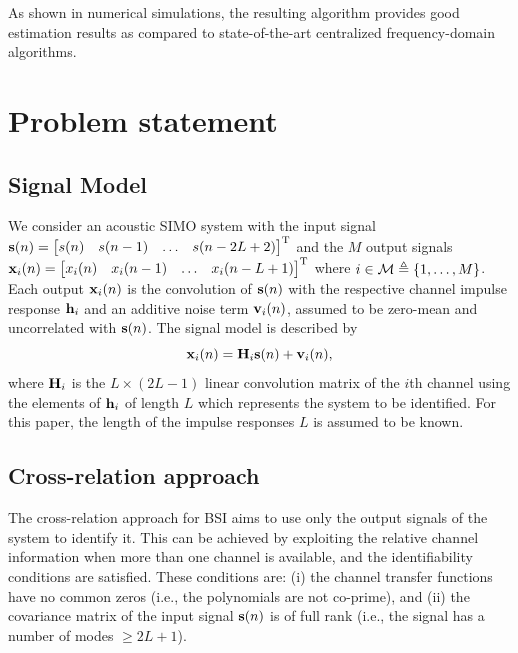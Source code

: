 \documentclass{article}
\begin{document}
As shown in numerical simulations, the resulting algorithm provides good estimation results as compared to state-of-the-art centralized frequency-domain algorithms.

\section{Problem statement}
\label{sec:problem_statement}

\subsection{Signal Model}
\label{ssec:signal_model}
We consider an acoustic SIMO system with the input signal \(\bm{\mathrm{s}}(n) = \begin{bmatrix}
    s(n)&s(n-1)&\ldots&s(n-2L+2)
\end{bmatrix}^{{\mathrm{T}}}\) and the \(M\) output signals \(\bm{\mathrm{x}}_i(n)= \begin{bmatrix}
    x_i(n)&x_i(n-1)&\ldots&x_i(n-L+1)
\end{bmatrix}^{{\mathrm{T}}}\)
where \(i \in \mathcal{M} \triangleq \{1, \ldots, M\} \).
Each output \(\bm{\mathrm{x}}_i(n)\) is the convolution of \(\bm{\mathrm{s}}(n)\) with the respective channel impulse response \(\bm{\mathrm{h}}_i\) and an additive noise term \(\bm{\mathrm{v}}_i(n)\), assumed to be zero-mean and uncorrelated with \(\bm{\mathrm{s}}(n)\).
The signal model is described by
\begin{equation}
    \bm{\mathrm{x}}_i(n) = \bm{\mathrm{H}}_i \bm{\mathrm{s}}(n) + \bm{\mathrm{v}}_i(n),
\end{equation}
where \(\bm{\mathrm{H}}_i\) is the \(L \times (2L-1)\) linear convolution matrix of the \(i\)th channel using the elements of \(\bm{\mathrm{h}}_i\) of length \(L\) which represents the system to be identified.
For this paper, the length of the impulse responses \(L\) is assumed to be known.

\subsection{Cross-relation approach}
\label{ssec:cross_rel}
The cross-relation approach for BSI aims to use only the output signals of the system to identify it.
This can be achieved by exploiting the relative channel information when more than one channel is available, and the identifiability conditions \cite{guanghanxuLeastsquaresApproachBlind1995} are satisfied. These conditions are: (i) the channel transfer functions have no common zeros (i.e., the polynomials are not co-prime), and (ii) the covariance matrix of the input signal \(\bm{\mathrm{s}}(n)\) is of full rank (i.e., the signal has a number of modes \(\geq 2L+1\)).
\end{document}
